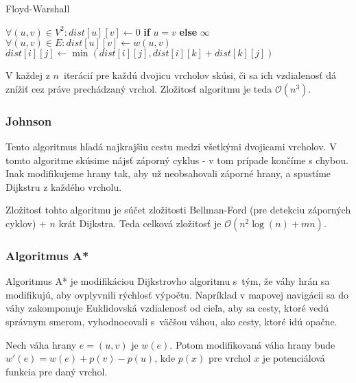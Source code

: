 \begin{algorithm}[H]
\caption{Floyd-Warshall}
\begin{algorithmic}[1]
    \State $\forall (u,v) \in V^2 : dist[u][v] \gets 0$
        \textbf{if} $u = v$ \textbf{else} $\infty$
    \State $\forall (u,v) \in E : dist[u][v] \gets w(u,v)$
                \State $dist[i][j] \gets \min(dist[i][j], dist[i][k] + dist[k][j])$
            \EndFor
        \EndFor
    \EndFor
\EndFunction
\end{algorithmic}
\end{algorithm}

V každej z $n$~iterácií pre každú dvojicu vrcholov skúsi,
či sa ich vzdialenosť dá znížiť cez práve prechádzaný vrchol. 
Zložitosť algoritmu je teda $\mathcal{O}(n^3)$.

\subsubsection*{Johnson}
Tento algoritmus hľadá najkrajšiu cestu medzi všetkými dvojicami vrcholov.
V tomto algoritme skúsime nájsť záporný cyklus - v tom prípade
končíme s chybou. Inak modifikujeme hrany tak, aby už neobsahovali
záporné hrany, a spustíme Dijkstru z každého vrcholu.

Zložitosť tohto algoritmu je súčet zložitosti Bellman-Ford (pre detekciu
záporných cyklov) + $n$ krát Dijkstra. Teda celková zložitosť
je $\mathcal{O}(n^2 \log(n) + mn)$.

\subsubsection*{Algoritmus A*}
Algoritmus A* je modifikáciou Dijkstrovho algoritmu s~tým,
že váhy hrán sa modifikujú, aby ovplyvnili rýchlosť výpočtu.
Napríklad v mapovej navigácii sa do váhy zakomponuje Euklidovská
vzdialenosť od cieľa, aby sa cesty, ktoré vedú správnym smerom,
vyhodnocovali s~väčšou váhou, ako cesty, ktoré idú opačne.

Nech váha hrany $e=(u,v)$ je $w(e)$. Potom modifikovaná
váha hrany bude $w'(e) = w(e) + p(v) - p(u)$, kde $p(x)$
pre vrchol $x$ je potenciálová funkcia pre daný vrchol.

